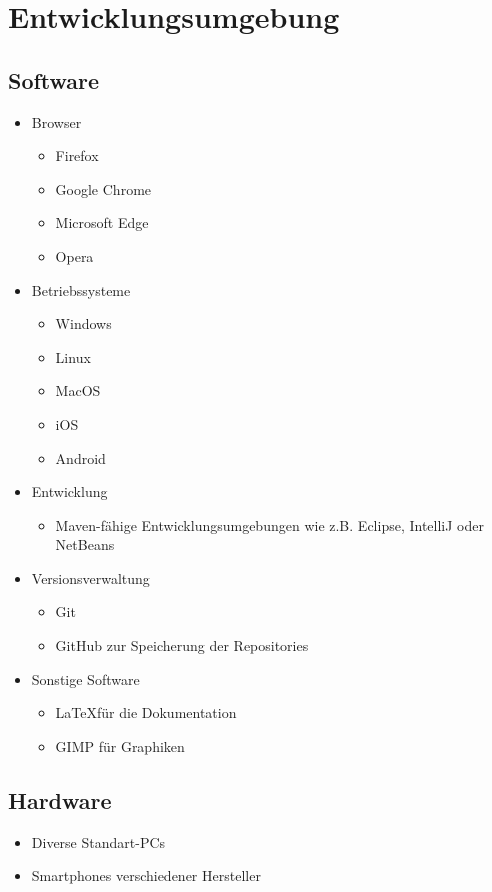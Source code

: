 \clearpage
\section{Entwicklungsumgebung}
\subsection{Software}
\begin{itemize}
    \item Browser
    \begin{itemize} [noitemsep]
        \item Firefox
        \item Google Chrome
        \item Microsoft Edge
        \item Opera
    \end{itemize} 
    \item Betriebssysteme
    \begin{itemize} [noitemsep]
        \item Windows
        \item Linux
        \item MacOS
        \item iOS
        \item Android
    \end{itemize}
    \item Entwicklung
    \begin{itemize} [noitemsep]
        \item Maven-fähige Entwicklungsumgebungen wie z.B. \gls{Eclipse}, \gls{IntelliJ} oder \gls{NetBeans}
    \end{itemize}
    \item Versionsverwaltung
    \begin{itemize} [noitemsep]
        \item \gls{Git}
        \item \gls{GitHub} zur Speicherung der Repositories
    \end{itemize}
    \item Sonstige Software
    \begin{itemize} [noitemsep]
        \item \LaTeX für die Dokumentation
        \item GIMP für Graphiken
    \end{itemize}
\end{itemize}
\subsection{Hardware}
\begin{itemize} [noitemsep]
    \item Diverse Standart-PCs
    \item \glspl{Smartphone} verschiedener Hersteller
\end{itemize}